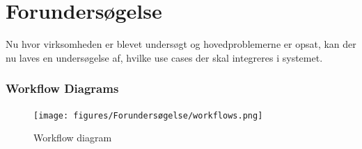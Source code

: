 \chapter{Forundersøgelse}\label{ch:forundersoegelse}
Nu hvor virksomheden er blevet undersøgt og hovedproblemerne er opsat, kan der nu laves en undersøgelse af, hvilke use cases der skal integreres i systemet.

\subsection{Workflow Diagrams}

\begin{figure}[H]
    \centering
    \texttt{[image: figures/Forundersøgelse/workflows.png]}
    \caption{Workflow diagram}
    \label{fig:workflows}
\end{figure}

